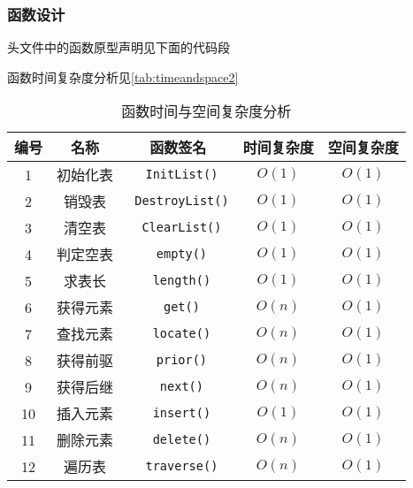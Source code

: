 \subsubsection{函数设计}
头文件中的函数原型声明见下面的代码段


函数时间复杂度分析见\autoref{tab:timeandspace2}
\begin{table}[h]
\centering
\caption{函数时间与空间复杂度分析}
\label{tab:timeandspace2}
\begin{tabular}{@{}ccccc@{}}
\toprule
编号                          & 名称  & 函数签名 & 时间复杂度 & 空间复杂度 \\ \toprule
    \multicolumn{1}{c|}{1}  & 初始化表 & \texttt{ InitList()} & $O(1)$ &  $O(1)$ \\
    \multicolumn{1}{c|}{2}  & 销毁表& \texttt{ DestroyList()} & $O(1)$ &  $O(1)$ \\
    \multicolumn{1}{c|}{3}  & 清空表& \texttt{ ClearList()} & $O(1)$ &  $O(1)$   \\
    \multicolumn{1}{c|}{4}  & 判定空表& \texttt{ empty()} & $O(1)$ &  $O(1)$     \\
    \multicolumn{1}{c|}{5}  & 求表长 & \texttt{ length()} & $O(1)$ &  $O(1)$     \\
    \multicolumn{1}{c|}{6}  & 获得元素 & \texttt{ get()} & $O(n)$ &  $O(1)$      \\
    \multicolumn{1}{c|}{7}  & 查找元素 & \texttt{ locate()} & $O(n)$ &  $O(1)$   \\
    \multicolumn{1}{c|}{8}  & 获得前驱 & \texttt{ prior()} & $O(n)$ &  $O(1)$    \\
    \multicolumn{1}{c|}{9}  & 获得后继 & \texttt{ next()} & $O(n)$ &  $O(1)$     \\
    \multicolumn{1}{c|}{10}  & 插入元素 & \texttt{ insert()} & $O(1)$ &  $O(1)$  \\
    \multicolumn{1}{c|}{11}  & 删除元素 & \texttt{ delete()} & $O(n)$ &  $O(1)$  \\
    \multicolumn{1}{c|}{12}  & 遍历表 & \texttt{ traverse()}   & $O(n)$ & $O(1)$ \\ \bottomrule
\end{tabular}
\end{table}
